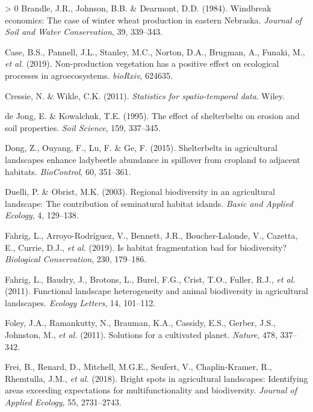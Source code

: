 \documentclass[]{elsarticle} %
\newlength{\cslhangindent}
\newenvironment{CSLReferences}[3] %
 {%
  \setlength{\parindent}{0pt}
  \ifodd #1 \everypar{\setlength{\hangindent}{\cslhangindent}}\ignorespaces\fi
  \ifnum #2 > 0
  \setlength{\parskip}{#2\baselineskip}
  \fi
 }%
 {}
\begin{document}
\begin{CSLReferences}{1}{0}
\leavevmode\hypertarget{ref-brandle1984}{}%
Brandle, J.R., Johnson, B.B. \& Dearmont, D.D. (1984). Windbreak economics: The case of winter wheat production in eastern {Nebraska}. \emph{Journal of Soil and Water Conservation}, 39, 339--343.

\leavevmode\hypertarget{ref-case2019}{}%
Case, B.S., Pannell, J.L., Stanley, M.C., Norton, D.A., Brugman, A., Funaki, M., \emph{et al.} (2019). Non-production vegetation has a positive effect on ecological processes in agroecosystems. \emph{bioRxiv}, 624635.

\leavevmode\hypertarget{ref-cressie2011}{}%
Cressie, N. \& Wikle, C.K. (2011). \emph{Statistics for spatio-temporal data}. Wiley.

\leavevmode\hypertarget{ref-deJong1995}{}%
de Jong, E. \& Kowalchuk, T.E. (1995). The effect of shelterbelts on erosion and soil properties. \emph{Soil Science}, 159, 337--345.

\leavevmode\hypertarget{ref-dong2015}{}%
Dong, Z., Ouyang, F., Lu, F. \& Ge, F. (2015). Shelterbelts in agricultural landscapes enhance ladybeetle abundance in spillover from cropland to adjacent habitats. \emph{BioControl}, 60, 351--361.

\leavevmode\hypertarget{ref-duelli2003}{}%
Duelli, P. \& Obrist, M.K. (2003). Regional biodiversity in an agricultural landscape: The contribution of seminatural habitat islands. \emph{Basic and Applied Ecology}, 4, 129--138.

\leavevmode\hypertarget{ref-fahrig2019}{}%
Fahrig, L., Arroyo-Rodríguez, V., Bennett, J.R., Boucher-Lalonde, V., Cazetta, E., Currie, D.J., \emph{et al.} (2019). Is habitat fragmentation bad for biodiversity? \emph{Biological Conservation}, 230, 179--186.

\leavevmode\hypertarget{ref-fahrig2011}{}%
Fahrig, L., Baudry, J., Brotons, L., Burel, F.G., Crist, T.O., Fuller, R.J., \emph{et al.} (2011). Functional landscape heterogeneity and animal biodiversity in agricultural landscapes. \emph{Ecology Letters}, 14, 101--112.

\leavevmode\hypertarget{ref-foley2011}{}%
Foley, J.A., Ramankutty, N., Brauman, K.A., Cassidy, E.S., Gerber, J.S., Johnston, M., \emph{et al.} (2011). Solutions for a cultivated planet. \emph{Nature}, 478, 337--342.

\leavevmode\hypertarget{ref-frei2018}{}%
Frei, B., Renard, D., Mitchell, M.G.E., Seufert, V., Chaplin-Kramer, R., Rhemtulla, J.M., \emph{et al.} (2018). Bright spots in agricultural landscapes: Identifying areas exceeding expectations for multifunctionality and biodiversity. \emph{Journal of Applied Ecology}, 55, 2731--2743.


\end{CSLReferences}
\end{document}
